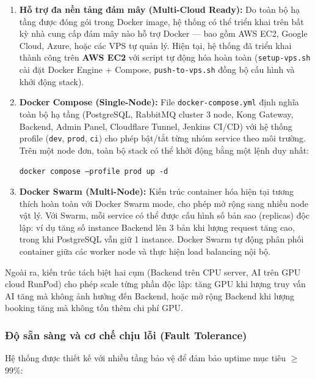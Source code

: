 \begin{enumerate}
    \item \textbf{Hỗ trợ đa nền tảng đám mây (Multi-Cloud Ready):} Do toàn bộ hạ tầng được đóng gói trong Docker image, hệ thống có thể triển khai trên bất kỳ nhà cung cấp đám mây nào hỗ trợ Docker --- bao gồm AWS EC2, Google Cloud, Azure, hoặc các VPS tự quản lý. Hiện tại, hệ thống đã triển khai thành công trên \textbf{AWS EC2} với script tự động hóa hoàn toàn (\texttt{setup-vps.sh} cài đặt Docker Engine + Compose, \texttt{push-to-vps.sh} đồng bộ cấu hình và khởi động stack).
    
    \item \textbf{Docker Compose (Single-Node):} File \texttt{docker-compose.yml} định nghĩa toàn bộ hạ tầng (PostgreSQL, RabbitMQ cluster 3 node, Kong Gateway, Backend, Admin Panel, Cloudflare Tunnel, Jenkins CI/CD) với hệ thống profile (\texttt{dev}, \texttt{prod}, \texttt{ci}) cho phép bật/tắt từng nhóm service theo môi trường. Trên một node đơn, toàn bộ stack có thể khởi động bằng một lệnh duy nhất:
    
    \texttt{docker compose --profile prod up -d}
    
    \item \textbf{Docker Swarm (Multi-Node):} Kiến trúc container hóa hiện tại tương thích hoàn toàn với Docker Swarm mode, cho phép mở rộng sang nhiều node vật lý. Với Swarm, mỗi service có thể được cấu hình số bản sao (replicas) độc lập: ví dụ tăng số instance Backend lên 3 bản khi lượng request tăng cao, trong khi PostgreSQL vẫn giữ 1 instance. Docker Swarm tự động phân phối container giữa các worker node và thực hiện load balancing nội bộ.
\end{enumerate}

Ngoài ra, kiến trúc tách biệt hai cụm (Backend trên CPU server, AI trên GPU cloud RunPod) cho phép scale từng phần độc lập: tăng GPU khi lượng truy vấn AI tăng mà không ảnh hưởng đến Backend, hoặc mở rộng Backend khi lượng booking tăng mà không tốn thêm chi phí GPU.

\subsubsection{Độ sẵn sàng và cơ chế chịu lỗi (Fault Tolerance)}

Hệ thống được thiết kế với nhiều tầng bảo vệ để đảm bảo uptime mục tiêu $\geq$ 99\%:

